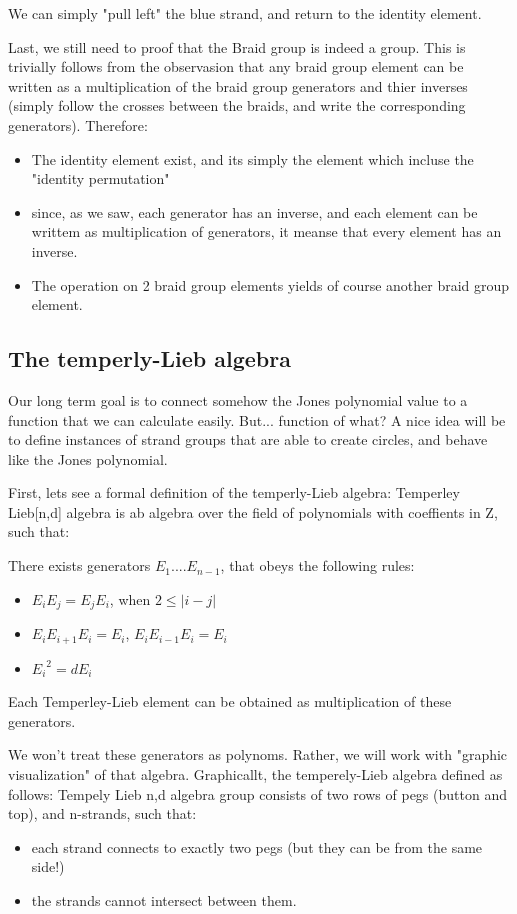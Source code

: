 \documentclass{article}
\begin{document}
We can simply "pull left" the blue strand, and return to the identity element.

Last, we still need to proof that the Braid group is indeed a group. This is trivially follows from the observasion that any braid group element can be written as a multiplication of the braid group generators and thier inverses (simply follow the crosses between the braids, and write the corresponding generators). Therefore:
\begin{itemize}
\item The identity element exist, and its simply the element which incluse the "identity permutation"
\item since, as we saw, each generator has an inverse, and each element can be writtem as multiplication of generators, it meanse that every element has an inverse.
\item The operation on 2 braid group elements yields of course another braid group element.
\end{itemize}

\subsection{The temperly-Lieb algebra}

Our long term goal is to connect somehow the Jones polynomial value to a function that we can calculate easily.
But... function of what? 
A nice idea will be to define instances of strand groups that are able to create circles, and behave like the Jones polynomial.

First, lets see a formal definition of the temperly-Lieb algebra:
Temperley Lieb[n,d] algebra is ab algebra over the field of polynomials with coeffients in Z, such that:

There exists generators $E_{1}....E_{n-1}$, that obeys the following rules:
\begin{itemize}
\item \(E_{i}E_{j} = E_{j}E_{i}\), when \(2 \leq |i-j|\)
\item \(E_{i}E_{i+1}E_{i} = E_{i}\), \(E_{i}E_{i-1}E_{i} = E_{i}\)
\item \({E_{i}}^2 = dE_{i}\)
\end{itemize}

Each Temperley-Lieb element can be obtained as multiplication of these generators.

We won't treat these generators as polynoms. Rather, we will work with "graphic visualization" of that algebra. Graphicallt, the temperely-Lieb algebra defined as follows:
Tempely Lieb {n,d} algebra group consists of two rows of pegs (button and top), and n-strands, such that:
\begin{itemize}
\item each strand connects to exactly two pegs (but they can be from the same side!)
\item the strands cannot intersect between them.
\end{itemize}
\end{document}
